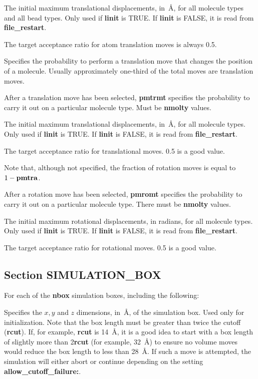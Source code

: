 \documentclass[12pt,letterpaper]{article}
\begin{document}
 The initial maximum translational
displacements, in~\AA, for all molecule types and all bead
types. Only used if {\bf linit} is TRUE. If {\bf linit} is
FALSE, it is read from {\bf file\_restart}.

\noindent The target acceptance ratio for atom translation
moves is always 0.5.

 Specifies the probability to perform a
translation move that changes the position of a molecule.
Usually approximately one-third of the total moves are
translation moves.

 After a translation move has been
selected, {\bf pmtrmt} specifies the probability to carry it
out on a particular molecule type. Must be {\bf nmolty}
values.

 The initial maximum translational
displacements, in~\AA, for all molecule types. Only used if
{\bf linit} is TRUE. If {\bf linit} is FALSE, it is read
from {\bf file\_restart}.

 The target acceptance ratio for
translational moves. 0.5 is a good value.

Note that, although not specified, the fraction of rotation
moves is equal to $1 - {\bf pmtra}$.

 After a rotation move has been
selected, {\bf pmromt} specifies the probability to carry it
out on a particular molecule type. There must be {\bf
  nmolty} values.

 The initial maximum rotational
displacements, in radians, for all molecule types. Only used
if {\bf linit} is TRUE. If {\bf linit} is FALSE, it is read
from {\bf file\_restart}.

 The target acceptance ratio for
rotational moves. 0.5 is a good value.

\subsection{Section \textbf{SIMULATION\_BOX}}
For each of the \textbf{nbox} simulation boxes, including
the following:

 Specifies the $x, y$ and
$z$ dimensions, in~\AA, of the simulation box. Used only for
initialization. Note that the box length must be greater
than twice the cutoff ({\bf rcut}). If, for example, {\bf
  rcut} is 14~\AA, it is a good idea to start with a box
length of slightly more than 2{\bf rcut} (for example,
32~\AA) to ensure no volume moves would reduce the box
length to less than 28~\AA. If such a move is attempted, the
simulation will either abort or continue depending on the
setting {\bf allow\_cutoff\_failure:}.
\end{document}
